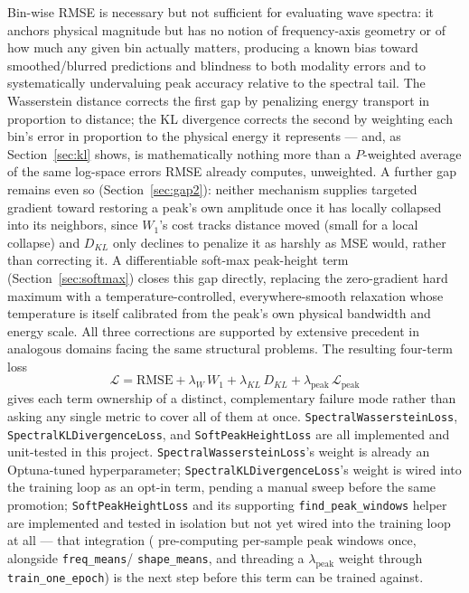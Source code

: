 \documentclass[11pt,a4paper]{article}
\begin{document}
Bin-wise RMSE is necessary but not sufficient for evaluating wave spectra:
it anchors physical magnitude but has no notion of frequency-axis geometry
or of how much any given bin actually matters, producing a known bias
toward smoothed/blurred predictions and blindness to both modality errors
and to systematically undervaluing peak accuracy relative to the spectral
tail. The Wasserstein distance corrects the first gap by penalizing energy
transport in proportion to distance; the KL divergence corrects the second
by weighting each bin's error in proportion to the physical energy it
represents — and, as Section~\ref{sec:kl} shows, is mathematically nothing
more than a $P$-weighted average of the same log-space errors RMSE already
computes, unweighted. A further gap remains even so (Section~\ref{sec:gap2}):
neither mechanism supplies targeted gradient toward restoring a peak's own
amplitude once it has locally collapsed into its neighbors, since $W_1$'s
cost tracks distance moved (small for a local collapse) and $D_{KL}$ only
declines to penalize it as harshly as MSE would, rather than correcting it.
A differentiable soft-max peak-height term (Section~\ref{sec:softmax})
closes this gap directly, replacing the zero-gradient hard maximum with a
temperature-controlled, everywhere-smooth relaxation whose temperature is
itself calibrated from the peak's own physical bandwidth and energy scale.
All three corrections are supported by extensive precedent in analogous
domains facing the same structural problems. The resulting four-term loss
\begin{equation*}
\mathcal{L} = \text{RMSE} + \lambda_W\, W_1 + \lambda_{KL}\, D_{KL}
+ \lambda_{\text{peak}}\, \mathcal{L}_{\text{peak}}
\end{equation*}
gives each term ownership of a distinct, complementary failure mode rather
than asking any single metric to cover all of them at once.
\texttt{SpectralWassersteinLoss}, \texttt{SpectralKLDivergenceLoss}, and
\texttt{SoftPeakHeightLoss} are all implemented and unit-tested in this
project. \texttt{SpectralWassersteinLoss}'s weight is already an
Optuna-tuned hyperparameter; \texttt{SpectralKLDivergenceLoss}'s weight is
wired into the training loop as an opt-in term, pending a manual sweep
before the same promotion; \texttt{SoftPeakHeightLoss} and its supporting
\texttt{find\_peak\_windows} helper are implemented and tested in isolation
but not yet wired into the training loop at all — that integration (
pre-computing per-sample peak windows once, alongside \texttt{freq\_means}/
\texttt{shape\_means}, and threading a $\lambda_{\text{peak}}$ weight
through \texttt{train\_one\_epoch}) is the next step before this term can
be trained against.
\end{document}
